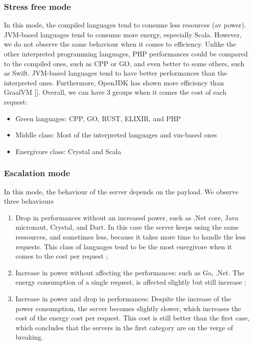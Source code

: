 \subsubsection{Stress free mode}
In this mode, the compiled languages tend to consume less resources (av power). JVM-based languages tend to consume more energy, especially Scala. However, we do not observe the same behaviour when it comes to efficiency. Unlike the other interpreted programming languages, PHP performances could be compared to the compiled ones, such as CPP or GO, and even better to some others, such as Swift. JVM-based languages tend to have better performances than the interpreted ones. Furthermore, OpenJDK has shown more efficiency than GraalVM []. Overall, we can have 3 groups when it comes the cost of each request:
\begin{itemize}
    \item Green languages: CPP, GO, RUST, ELIXIR, and PHP
    \item Middle class: Most of the interpreted languages and vm-based ones
    \item Energivore class: Crystal and Scala
\end{itemize}

\subsubsection{Escalation mode}
In this mode, the behaviour of the server depends on the payload. We observe three behaviours
\begin{enumerate}
    \item Drop in performances without an increased power, such as .Net core, Java micronaut, Crystal, and Dart. In this case the server keeps using the same ressources, and sometimes less, because it takes more time to handle the less requests. This class of languages tend to be the most energivore when it comes to the cost per request ;
    \item Increase in power without affecting the performances: such as Go, .Net. The energy consumption of a single request, is affected slightly but still increase ;
    \item Increase in power and drop in performances: Despite the increase of the power consumption, the server becomes slightly slower, which increases the cost of the energy cost per request. This cost is still better than the first case, which concludes  that the servers in the first category are on the verge of breaking.
\end{enumerate}

